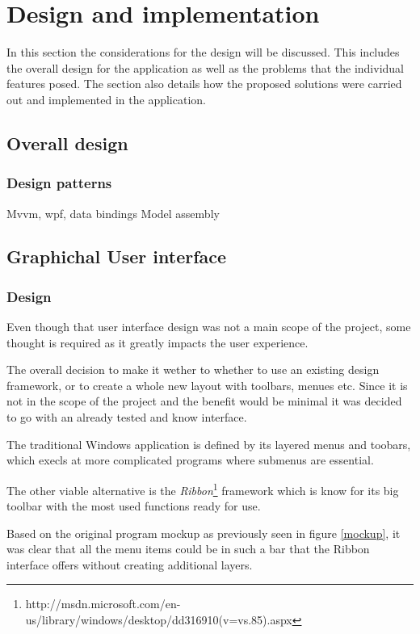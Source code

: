 \section{Design and implementation} 

In this section the considerations for the
design will be discussed. This includes the overall design for the application
as well as the problems that the individual features posed. The section also
details how the proposed solutions were carried out and implemented in the
application.

\subsection{Overall design}
\subsubsection{Design patterns} 

Mvvm, wpf, data bindings Model assembly

\subsection{Graphichal User interface} 

\subsubsection{Design} 

Even though that
user interface design was not a main scope of the project, some thought is
required as it greatly impacts the user experience. 

The overall decision to make it wether to whether to use an existing design
framework, or to create a whole new layout with toolbars, menues etc. Since it
is not in the scope of the project and the benefit would be minimal it was
decided to go with an already tested and know interface. 

The traditional Windows application is defined by its layered menus and toobars,
which execls at more complicated programs where submenus are essential.

The other viable alternative is the
\textit{Ribbon}\footnote{http://msdn.microsoft.com/en-us/library/windows/desktop/dd316910(v=vs.85).aspx}
framework which is know for its big toolbar with the most used functions ready
for use.

Based on the original program mockup as previously seen in figure \ref{mockup},
it was clear that all the menu items could be in such a bar that the Ribbon
interface offers without creating additional layers.

